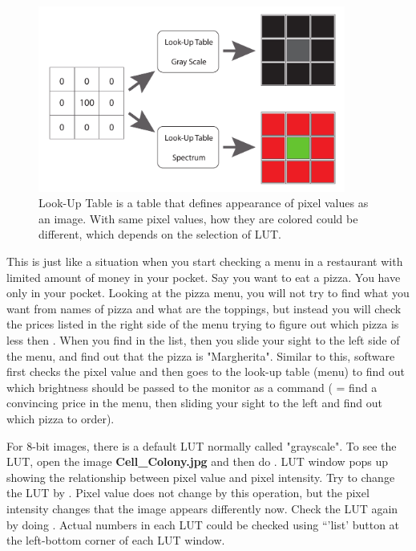 \begin{figure}[h!]
\begin{center}
\includegraphics[width=0.9\textwidth]{fig/LUT.pdf}
\caption{Look-Up Table is a table that defines appearance of pixel values as an image. With same pixel values, how they are colored could be different, which depends on the selection of LUT. }
\label{fig:lutscheme}
\end{center}
\end{figure}

This is just like a situation when you start checking a menu in a
restaurant with limited amount of money in your pocket. Say you want to
eat a pizza. You have only  in your pocket. Looking at the
pizza menu, you will not try to find what you want from names of pizza
and what are the toppings, but instead you will check the prices listed
in the right side of the menu trying to figure out which pizza is less
then . When you find  in the list, then you slide your
sight to the left side of the menu, and find out that the pizza is
"Margherita". Similar to this,
software first checks the pixel value and then goes to the look-up
table (menu) to find out which brightness should be passed to the
monitor as a command ( = find a convincing price in the menu, then
sliding your sight to the left and find out which pizza to order).





\begin{indentexercise}{1}
For 8-bit images, there is a default LUT normally called "grayscale". 
To see the LUT, open the image \textbf{Cell\_Colony.jpg} and then 
do . LUT window pops up showing 
the relationship between pixel value and pixel intensity. 
Try to change the LUT by . 
Pixel value does not change by this operation, but the pixel intensity changes 
that the image appears differently now. Check the LUT again by doing . 
Actual numbers in each LUT could be checked using ``'list' button at the left-bottom corner of each LUT window. 
\end{indentexercise}

